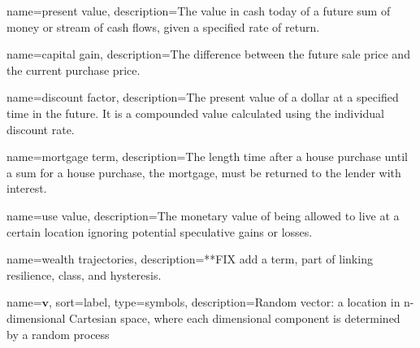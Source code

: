 {
name=present value,
description={The value in cash today of a future sum of money or stream of cash flows, given a specified rate of return.}
}

{
name=capital gain,
description={The difference between the future sale price and the current purchase price.}
}

{
name=discount factor,
description={The present value of a dollar at a specified time in the future. It is a compounded value calculated using the individual discount rate.}
}

{
name=mortgage term,
description={The length time after a house purchase until a sum for a house purchase, the mortgage, must be returned to the lender with interest.}
}

{
name=use value,
description={The monetary value of being allowed to live at a certain location ignoring potential speculative gains or losses.}
}

{
name=wealth trajectories,
description={**FIX add a term, part of linking resilience, class, and hysteresis.}
}







{
name={$\mathbf{v}$},
sort={label},
type=symbols,
description={Random vector: a location in n-dimensional Cartesian space, where each dimensional component is determined by a random process}
}